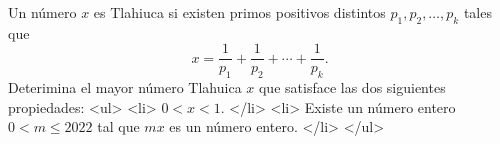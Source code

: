 Un número $x$ es Tlahiuca si existen primos positivos distintos $p_1,p_2,\dots,p_k$ tales que 
\[x=\frac{1}{p_1}+\frac{1}{p_2}+\cdots+\frac{1}{p_k}.\]
Deterimina el mayor número Tlahuica $x$ que satisface las dos siguientes propiedades:
<ul>
<li> $0\lt x\lt 1$. </li>
<li> Existe un número entero $0\lt m\leq 2022$ tal que $mx$ es un número entero. </li>
</ul>